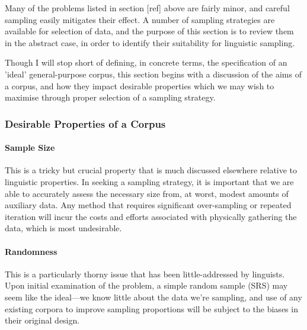 









Many of the problems listed in section [ref] above are fairly minor, and careful sampling easily mitigates their effect.  A number of sampling strategies are available for selection of data, and the purpose of this section is to review them in the abstract case, in order to identify their suitability for linguistic sampling.

Though I will stop short of defining, in concrete terms, the specification of an 'ideal' general-purpose corpus, this section begins with a discussion of the aims of a corpus, and how they impact desirable properties which we may wish to maximise through proper selection of a sampling strategy. 


\subsubsection{Desirable Properties of a Corpus}



\paragraph{Sample Size}
This is a tricky but crucial property that is much discussed elsewhere relative to linguistic properties.  In seeking a sampling strategy, it is important that we are able to accurately assess the necessary size from, at worst, modest amounts of auxiliary data.  Any method that requires significant over-sampling or repeated iteration will incur the costs and efforts associated with physically gathering the data, which is most undesirable.



\paragraph{Randomness}
This is a particularly thorny issue that has been little-addressed by linguists.  Upon initial examination of the problem, a simple random sample (SRS) may seem like the ideal---we know little about the data we're sampling, and use of any existing corpora to improve sampling proportions will be subject to the biases in their original design.  

